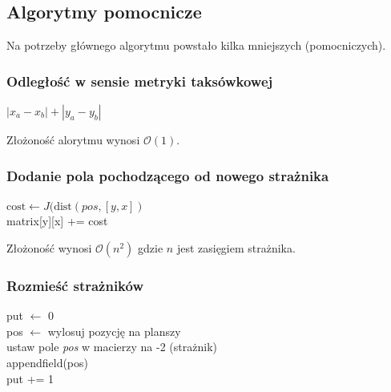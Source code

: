 \documentclass[12pt]{article}
\begin{document}
\subsection{Algorytmy pomocnicze}
Na potrzeby głównego algorytmu powstało kilka mniejszych (pomocniczych).
\subsubsection{Odległość w sensie metryki taksówkowej}

\begin{algorithm}[H]
\Begin
{
\Return $|x_a - x_b| + |y_a - y_b|$
}
\caption{distance}
\end{algorithm}

Złożoność alorytmu wynosi $\mathcal{O}(1)$.

\subsubsection{Dodanie pola pochodzącego od nowego strażnika}


\begin{algorithm}[H]
\Begin
{
	{
		{
			{
			 	{
			 		$\text{cost} \leftarrow J(\text{dist}(pos, [y,x])$ \\
			 		matrix[y][x] += cost
			 	}
			}
		}
	}
}

\caption{append\textunderscore field}
\end{algorithm}
Złożoność wynosi $\mathcal{O}(n^2)$ gdzie $n$ jest zasięgiem strażnika.

\subsubsection{Rozmieść strażników}
\begin{algorithm}[H]
\Begin
{
	put $\leftarrow$ 0 \\
	{
		pos $\leftarrow$ wylosuj pozycję na planszy \\
		{
			ustaw pole \emph{pos} w macierzy na -2 (strażnik) \\
			append\textunderscore field(pos) \\
			put += 1
		}
	}
	
}
\caption{put\textunderscore guards}
\end{algorithm}
\end{document}
